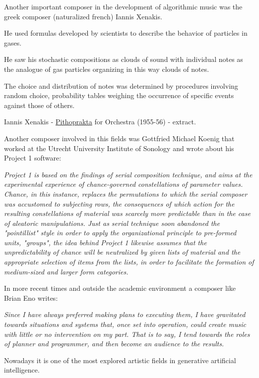 Another important composer in the development of algorithmic music was the greek composer (naturalized french) Iannis Xenakis.

He used formulas developed by scientists to describe the behavior of particles in gases.

He saw his stochastic compositions as clouds of sound with individual notes as the analogue of gas particles organizing in this way clouds of notes.

The choice and distribution of notes was determined by procedures involving random choice, probability tables weighing the occurrence of specific events against those of others.


Iannis Xenakis - \href{http://www.musicaecodice.it/gitmedia/emc/5_media/xen1.mp4}{Pithoprakta} for Orchestra (1955-56) - extract.

Another composer involved in this fields was Gottfried Michael Koenig that worked at the Utrecht University Institute of Sonology and wrote about his Project 1 software:

\textit{Project 1 is based on the findings of serial composition technique, and aims at the experimental experience of chance-governed constellations of parameter values. Chance, in this instance, replaces the permutations to which the serial composer was accustomed to
subjecting rows, the consequences of which action for the resulting constellations of material was scarcely more predictable than in the case of aleatoric manipulations. Just as serial technique soon abandoned the "pointillist" style in order to apply the organizational principle to pre-formed units, "groups", the idea behind Project 1 likewise assumes that the unpredictability of chance will be neutralized by given
lists of material and the appropriate selection of items from the lists, in order to facilitate the formation of medium-sized and larger form categories.}

In more recent times and outside the academic environment a composer like Brian Eno writes:

\textit{Since I have always preferred making plans to executing them, I have
gravitated towards situations and systems that, once set into operation,
could create music with little or no intervention on my part. That is to
say, I tend towards the roles of planner and programmer, and then become
an audience to the results.}

Nowadays it is one of the most explored artistic fields in generative artificial intelligence.

